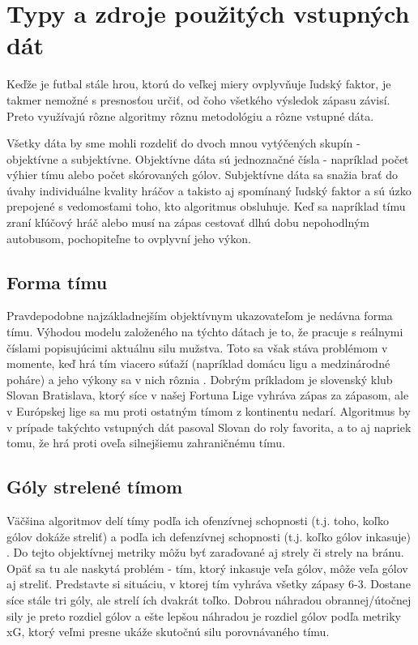 \documentclass[10pt,twoside,slovak,a4paper]{article}
\begin{document}
\section{Typy a zdroje použitých vstupných dát}

Keďže je futbal stále hrou, ktorú do veľkej miery ovplyvňuje ľudský faktor, je takmer nemožné s presnosťou určiť, od čoho všetkého výsledok zápasu závisí. Preto využívajú rôzne algoritmy rôznu metodológiu a rôzne vstupné dáta.

Všetky dáta by sme mohli rozdeliť do dvoch mnou vytýčených skupín - objektívne a subjektívne. Objektívne dáta sú jednoznačné čísla - napríklad počet výhier tímu alebo počet skórovaných gólov. Subjektívne dáta sa snažia brať do úvahy individuálne kvality hráčov a takisto aj spomínaný ľudský faktor a sú úzko prepojené s vedomosťami toho, kto algoritmus obsluhuje. Keď sa napríklad tímu zraní kľúčový hráč alebo musí na zápas cestovať dlhú dobu nepohodlným autobusom, pochopiteľne to ovplyvní jeho výkon.

\subsection{Forma tímu}

Pravdepodobne najzákladnejším objektívnym ukazovateľom je nedávna forma tímu. Výhodou modelu založeného na týchto dátach je to, že pracuje s reálnymi číslami popisujúcimi aktuálnu silu mužstva. Toto sa však stáva problémom v momente, keď hrá tím viacero súťaží (napríklad domácu ligu a medzinárodné poháre) a jeho výkony sa v nich rôznia \cite{dixon1997modelling}. Dobrým príkladom je slovenský klub Slovan Bratislava, ktorý síce v našej Fortuna Lige vyhráva zápas za zápasom, ale v Európskej lige sa mu proti ostatným tímom z kontinentu nedarí. Algoritmus by v prípade takýchto vstupných dát pasoval Slovan do roly favorita, a to aj napriek tomu, že hrá proti oveľa silnejšiemu zahraničnému tímu.

\subsection{Góly strelené tímom}

Väčšina algoritmov delí tímy podľa ich ofenzívnej schopnosti (t.j. toho, koľko gólov dokáže streliť) a podľa ich defenzívnej schopnosti (t.j. koľko gólov inkasuje) \cite{dixon1997modelling} \cite{razali2017predicting}. Do tejto objektívnej metriky môžu byť zaraďované aj strely či strely na bránu. Opäť sa tu ale naskytá problém - tím, ktorý inkasuje veľa gólov, môže veľa gólov aj streliť. Predstavte si situáciu, v ktorej tím vyhráva všetky zápasy 6-3. Dostane síce stále tri góly, ale strelí ích dvakrát toľko. Dobrou náhradou obrannej/útočnej sily je preto rozdiel gólov a ešte lepšou náhradou je rozdiel gólov podľa metriky xG, ktorý veľmi presne ukáže skutočnú silu porovnávaného tímu.
\end{document}
